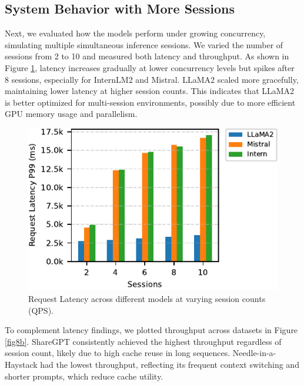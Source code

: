 \documentclass[sigconf,nonacm]{acmart}
\begin{document}
\subsection{System Behavior with More Sessions}
Next, we evaluated how the models perform under growing concurrency, simulating multiple simultaneous inference sessions. We varied the number of sessions from 2 to 10 and measured both latency and throughput.
As shown in Figure \ref{fig7a}, latency increases gradually at lower concurrency levels but spikes after 8 sessions, especially for InternLM2 and Mistral. LLaMA2 scaled more gracefully, maintaining lower latency at higher session counts. This indicates that LLaMA2 is better optimized for multi-session environments, possibly due to more efficient GPU memory usage and parallelism.
\begin{figure}[h]
    \centering
    \includegraphics[scale=0.8]{figure7a.pdf}
    \vspace{-1.0em}  
    \caption{Request Latency across different models at varying session counts (QPS).}
    \label{fig7a}
\end{figure}
\par To complement latency findings, we plotted throughput across datasets in Figure \ref{fig8b}. ShareGPT consistently achieved the highest throughput regardless of session count, likely due to high cache reuse in long sequences. Needle-in-a-Haystack had the lowest throughput, reflecting its frequent context switching and shorter prompts, which reduce cache utility.
\end{document}

